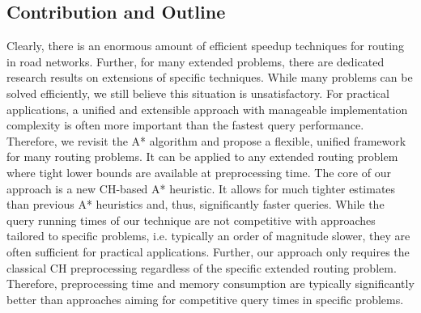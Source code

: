 \documentclass[manuscript]{acmart}
\begin{document}

\subsection{Contribution and Outline}

Clearly, there is an enormous amount of efficient speedup techniques for routing in road networks.
Further, for many extended problems, there are dedicated research results on extensions of specific techniques.
While many problems can be solved efficiently, we still believe this situation is unsatisfactory.
For practical applications, a unified and extensible approach with manageable implementation complexity is often more important than the fastest query performance.
Therefore, we revisit the A* algorithm and propose a flexible, unified framework for many routing problems.
It can be applied to any extended routing problem where tight lower bounds are available at preprocessing time.
The core of our approach is a new CH-based A* heuristic.
It allows for much tighter estimates than previous A* heuristics and, thus, significantly faster queries.
While the query running times of our technique are not competitive with approaches tailored to specific problems, i.e. typically an order of magnitude slower, they are often sufficient for practical applications.
Further, our approach only requires the classical CH preprocessing regardless of the specific extended routing problem.
Therefore, preprocessing time and memory consumption are typically significantly better than approaches aiming for competitive query times in specific problems.
\end{document}

